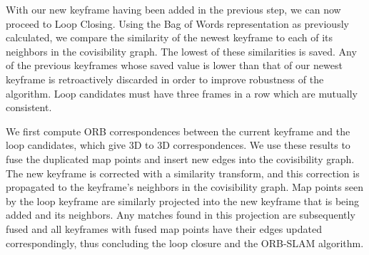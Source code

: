 With our new keyframe having been added in the previous step, we can now proceed to Loop Closing. Using the Bag of Words representation as previously calculated, we compare the similarity of the newest keyframe to each of its neighbors in the covisibility graph. The lowest of these similarities is saved. Any of the previous keyframes whose saved value is lower than that of our newest keyframe is retroactively discarded in order to improve robustness of the algorithm. Loop candidates must have three frames in a row which are mutually consistent.

We first compute ORB correspondences between the current keyframe and the loop candidates, which give 3D to 3D correspondences. We use these results to fuse the duplicated map points and insert new edges into the covisibility graph. The new keyframe is corrected with a similarity transform, and this correction is propagated to the keyframe's neighbors in the covisibility graph. Map points seen by the loop keyframe are similarly projected into the new keyframe that is being added and its neighbors. Any matches found in this projection are subsequently fused and all keyframes with fused map points have their edges updated correspondingly, thus concluding the loop closure and the ORB-SLAM algorithm.
